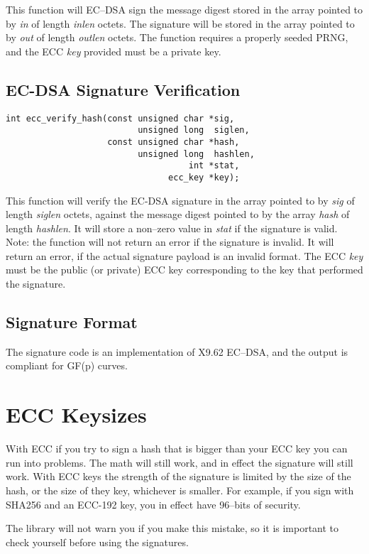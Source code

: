 \documentclass[synpaper]{book}
\newcommand{\mysection}[1]    %
	{                   %
	\section{#1}
   \markboth{\textsf{www.libtom.org}}{\thesection ~ {#1}}
	}
\begin{document}
This function will EC--DSA sign the message digest stored in the array pointed to by \textit{in} of length \textit{inlen} octets.  The signature
will be stored in the array pointed to by \textit{out} of length \textit{outlen} octets.  The function requires a properly seeded PRNG, and
the ECC \textit{key} provided must be a private key.

\subsection{EC-DSA Signature Verification}
\begin{verbatim}
int ecc_verify_hash(const unsigned char *sig,
                          unsigned long  siglen,
                    const unsigned char *hash,
                          unsigned long  hashlen,
                                    int *stat,
                                ecc_key *key);
\end{verbatim}

This function will verify the EC-DSA signature in the array pointed to by \textit{sig} of length \textit{siglen} octets, against the message digest
pointed to by the array \textit{hash} of length \textit{hashlen}.  It will store a non--zero value in \textit{stat} if the signature is valid.  Note:
the function will not return an error if the signature is invalid.  It will return an error, if the actual signature payload is an invalid format.
The ECC \textit{key} must be the public (or private) ECC key corresponding to the key that performed the signature.

\subsection{Signature Format}
The signature code is an implementation of X9.62 EC--DSA, and the output is compliant for GF(p) curves.

\mysection{ECC Keysizes}
With ECC if you try to sign a hash that is bigger than your ECC key you can run into problems.  The math will still work, and in effect the signature will still
work.  With ECC keys the strength of the signature is limited by the size of the hash, or the size of they key, whichever is smaller.  For example, if you sign with
SHA256 and an ECC-192 key, you in effect have 96--bits of security.

The library will not warn you if you make this mistake, so it is important to check yourself before using the signatures.
\end{document}
